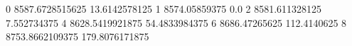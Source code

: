 0 8587.6728515625 13.6142578125
1 8574.05859375 0.0
2 8581.611328125 7.552734375
4 8628.5419921875 54.4833984375
6 8686.47265625 112.4140625
8 8753.8662109375 179.8076171875
